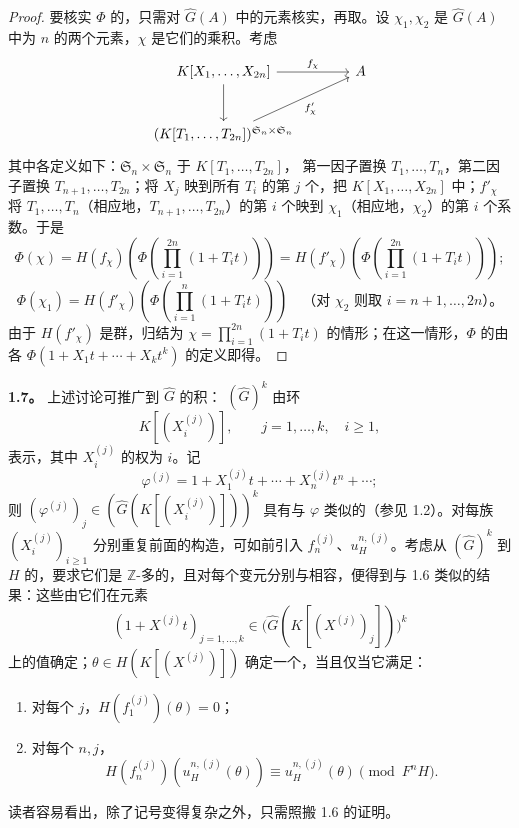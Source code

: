 \begin{proof}
要核实 $\Phi$ 的，只需对 $\widehat G(A)$ 中的元素核实，再取。设 $\chi_1,\chi_2$ 是 $\widehat G(A)$ 中为 $n$ 的两个元素，$\chi$ 是它们的乘积。考虑
\[
\begin{tikzcd}[column sep=large,row sep=large]
K[X_1,\ldots,X_{2n}]\arrow[r,"f_\chi"]\arrow[d] & A\\
(K[T_1,\ldots,T_{2n}])^{\mathfrak S_n\times\mathfrak S_n}
\arrow[ur,"f'_\chi"'] & {}
\end{tikzcd}
\]
其中各定义如下：$\mathfrak S_n\times\mathfrak S_n$ 于 $K[T_1,\ldots,T_{2n}]$，
第一因子置换 $T_1,\ldots,T_n$，第二因子置换 $T_{n+1},\ldots,T_{2n}$；将 $X_j$ 映到所有 $T_i$ 的第 $j$ 个，把 $K[X_1,\ldots,X_{2n}]$ 中；$f'_\chi$ 将 $T_1,\ldots,T_n$（相应地，$T_{n+1},\ldots,T_{2n}$）的第 $i$ 个映到 $\chi_1$（相应地，$\chi_2$）的第 $i$ 个系数。于是
\[
\Phi(\chi)=H(f_\chi)\left(\Phi\left(\prod_{i=1}^{2n}(1+T_it)\right)\right)
=H(f'_\chi)\left(\Phi\left(\prod_{i=1}^{2n}(1+T_it)\right)\right);
\]
\[
\Phi(\chi_1)=H(f'_\chi)\left(\Phi\left(\prod_{i=1}^{n}(1+T_it)\right)\right)
\quad\text{（对 $\chi_2$ 则取 $i=n+1,\ldots,2n$）。}
\]
由于 $H(f'_\chi)$ 是群，归结为 $\chi=\prod_{i=1}^{2n}(1+T_it)$ 的情形；在这一情形，$\Phi$ 的由各 $\Phi(1+X_1t+\cdots+X_kt^k)$ 的定义即得。
\end{proof}

\textbf{1.7。} 上述讨论可推广到 $\widehat G$ 的积： $(\widehat G)^k$ 由环
\[
K[(X_i^{(j)})],\qquad j=1,\ldots,k,\quad i\geqslant1,
\]
表示，其中 $X_i^{(j)}$ 的权为 $i$。记
\[
\varphi^{(j)}=1+X_1^{(j)}t+\cdots+X_n^{(j)}t^n+\cdots;
\]
则 $(\varphi^{(j)})_j\in(\widehat G(K[(X_i^{(j)})]))^k$ 具有与 $\varphi$ 类似的（参见 1.2）。对每族 $(X_i^{(j)})_{i\geqslant1}$ 分别重复前面的构造，可如前引入 $f_n^{(j)}$、$u_H^{n,(j)}$。考虑从 $(\widehat G)^k$ 到 $H$ 的，要求它们是 $\mathbb Z$-多的，且对每个变元分别与相容，便得到与 1.6 类似的结果：这些由它们在元素
\[
(1+X^{(j)}t)_{j=1,\ldots,k}\in
\bigl(\widehat G(K[(X^{(j)})_j])\bigr)^k
\]
上的值确定；$\theta\in H(K[(X^{(j)})])$ 确定一个，当且仅当它满足：
\begin{enumerate}
\item[i)] 对每个 $j$，$H(f_1^{(j)})(\theta)=0$；
\item[ii)] 对每个 $n,j$，
\[
H(f_n^{(j)})(u_H^{n,(j)}(\theta))
\equiv u_H^{n,(j)}(\theta)\pmod{F^nH}.
\]
\end{enumerate}
读者容易看出，除了记号变得复杂之外，只需照搬 1.6 的证明。

